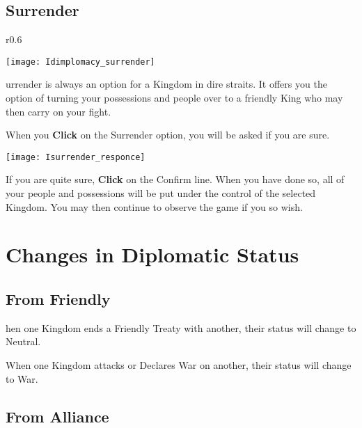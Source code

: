 \subsection{Surrender}


\begin{wrapfigure}{r}{0.6\textwidth}
    \vspace{-20pt}
    \begin{center}
        \texttt{[image: Idimplomacy\_surrender]} %
    \end{center}
    \vspace{-20pt}
\end{wrapfigure}

urrender is always an option for a Kingdom in dire straits. It offers you the option of turning your possessions and people over to a friendly King who may then carry on your fight.

When you \textbf{Click} on the Surrender option, you will be asked if you are sure.

\begin{center}
    \texttt{[image: Isurrender\_responce]} %
\end{center}

If you are quite sure, \textbf{Click} on the Confirm line. When you have done so, all of your people and possessions will be put under the control of the selected Kingdom. You may then continue to observe the game if you so wish.

\section{Changes in Diplomatic Status}


\subsection{From Friendly}

hen one Kingdom ends a Friendly Treaty with another, their status will change to Neutral.

When one Kingdom attacks or Declares War on another, their status will change to War.

\subsection{From Alliance}


